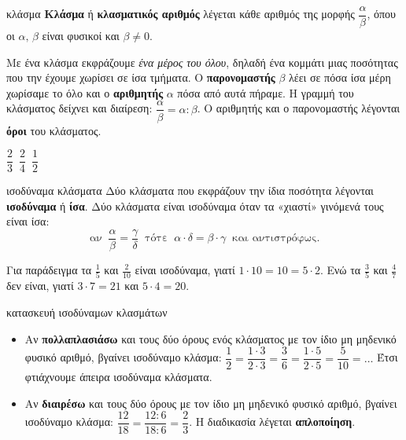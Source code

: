 

\begin{orismos}{κλάσμα}
\textbf{Κλάσμα} ή \textbf{κλασματικός αριθμός} λέγεται κάθε αριθμός της μορφής $\dfrac{\alpha}{\beta}$, όπου οι $\alpha,\,\beta$ είναι φυσικοί και $\beta\neq0$.
\end{orismos}

Με ένα κλάσμα εκφράζουμε \emph{ένα μέρος του όλου}, δηλαδή ένα κομμάτι μιας ποσότητας που την έχουμε χωρίσει σε ίσα τμήματα. Ο \textbf{παρονομαστής} $\beta$ λέει σε πόσα ίσα μέρη χωρίσαμε το όλο και ο \textbf{αριθμητής} $\alpha$ πόσα από αυτά πήραμε. Η γραμμή του κλάσματος δείχνει και διαίρεση: $\dfrac{\alpha}{\beta}=\alpha:\beta$. Ο αριθμητής και ο παρονομαστής λέγονται \textbf{όροι} του κλάσματος.

\begin{center}
\(\dfrac{2}{3}\)\ \qquad\qquad\(\dfrac{2}{4}\)\ \qquad\qquad\(\dfrac{1}{2}\)\ 
\end{center}

\begin{orismos}{ισοδύναμα κλάσματα}
Δύο κλάσματα που εκφράζουν την ίδια ποσότητα λέγονται \textbf{ισοδύναμα} ή \textbf{ίσα}. Δύο κλάσματα είναι ισοδύναμα όταν τα «χιαστί» γινόμενά τους είναι ίσα:
$$\text{αν }\ \dfrac{\alpha}{\beta}=\dfrac{\gamma}{\delta}\ \text{ τότε }\ \alpha\cdot\delta=\beta\cdot\gamma\ \text{ και αντιστρόφως.}$$
\end{orismos}

Για παράδειγμα τα $\frac{1}{5}$ και $\frac{2}{10}$ είναι ισοδύναμα, γιατί $1\cdot10=10=5\cdot2$. Ενώ τα $\frac{3}{5}$ και $\frac{4}{7}$ δεν είναι, γιατί $3\cdot7=21$ και $5\cdot4=20$.

\begin{kanonas}{κατασκευή ισοδύναμων κλασμάτων}
\begin{itemize}[leftmargin=1.2em,itemsep=0.3ex,topsep=2pt]
\item Αν \textbf{πολλαπλασιάσω} και τους δύο όρους ενός κλάσματος με τον ίδιο μη μηδενικό φυσικό αριθμό, βγαίνει ισοδύναμο κλάσμα: $\dfrac{1}{2}=\dfrac{1\cdot3}{2\cdot3}=\dfrac{3}{6}=\dfrac{1\cdot5}{2\cdot5}=\dfrac{5}{10}=\ldots$ Έτσι φτιάχνουμε άπειρα ισοδύναμα κλάσματα.
\item Αν \textbf{διαιρέσω} και τους δύο όρους με τον ίδιο μη μηδενικό φυσικό αριθμό, βγαίνει ισοδύναμο κλάσμα: $\dfrac{12}{18}=\dfrac{12:6}{18:6}=\dfrac{2}{3}$. Η διαδικασία λέγεται \textbf{απλοποίηση}.
\end{itemize}
\end{kanonas}


